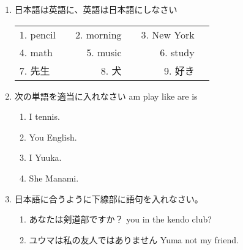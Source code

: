 \documentclass[fleqn]{jsarticle}
\begin{document}
\begin{enumerate}
  \item 日本語は英語に、英語は日本語にしなさい 
    \begin{table}[htb]
      \begin{tabular}{lcrrrr}
        1. pencil & \underline{\hspace{4zw}} & 2. morning & \underline{\hspace{3zw}} & 3. New York & \underline{\hspace{4zw}} \\
        4. math & \underline{\hspace{4zw}} & 5. music & \underline{\hspace{3zw}} & 6. study & \underline{\hspace{4zw}} \\
        7. 先生 & \underline{\hspace{4zw}} & 8. 犬 & \underline{\hspace{3zw}} & 9. 好き & \underline{\hspace{4zw}} \\
      \end{tabular}
    \end{table}
  \item 次の単語を適当に入れなさい
    am play like are is
    \begin{enumerate}
      \item I \underline{\hspace{4zw}} tennis.
      \item You \underline{\hspace{4zw}} English.
      \item I \underline{\hspace{4zw}} Yuuka.
      \item She \underline{\hspace{4zw}} Manami.
    \end{enumerate}
  \item 日本語に合うように下線部に語句を入れなさい。
    \begin{enumerate}
      \item あなたは剣道部ですか？ \underline{\hspace{3zw}} you in the kendo club?
      \item ユウマは私の友人ではありません Yuma \underline{\hspace{3zw}} not my friend.

\end{enumerate}
\end{enumerate}
\end{document}
